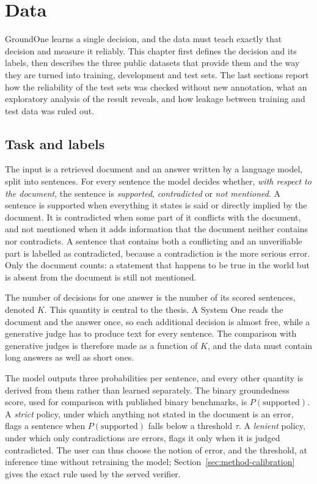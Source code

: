 \chapter{Data}
\label{ch:data}

GroundOne learns a single decision, and the data must teach exactly that decision and measure it reliably. This
chapter first defines the decision and its labels, then describes the three public datasets that provide them and the
way they are turned into training, development and test sets. The last sections report how the reliability of the
test sets was checked without new annotation, what an exploratory analysis of the result reveals, and how leakage
between training and test data was ruled out.


\section{Task and labels}
\label{sec:data-task}

The input is a retrieved document and an answer written by a language model, split into sentences. For every
sentence the model decides whether, \emph{with respect to the document}, the sentence is \emph{supported},
\emph{contradicted} or \emph{not mentioned}. A sentence is supported when everything it states is said or directly
implied by the document. It is contradicted when some part of it conflicts with the document, and not mentioned when it
adds information that the document neither contains nor contradicts. A sentence that contains both a conflicting and an
unverifiable part is labelled as contradicted, because a contradiction is the more serious error. Only the document
counts: a statement that happens to be true in the world but is absent from the document is still not mentioned.

The number of decisions for one answer is the number of its scored sentences, denoted $K$. This quantity is central to
the thesis. A System One reads the document and the answer once, so each additional decision is almost free, while a
generative judge has to produce text for every sentence. The comparison with generative judges is therefore made as a
function of $K$, and the data must contain long answers as well as short ones.

The model outputs three probabilities per sentence, and every other quantity is derived from them rather than learned
separately. The binary groundedness score, used for comparison with published binary benchmarks, is
$P(\text{supported})$. A \emph{strict} policy, under which anything not stated in the document is an error, flags a
sentence when $P(\text{supported})$ falls below a threshold $\tau$. A \emph{lenient} policy, under which only
contradictions are errors, flags it only when it is judged contradicted. The user can thus choose the notion of error, and
the threshold, at inference time without retraining the model; Section~\ref{sec:method-calibration} gives the exact rule
used by the served verifier.

